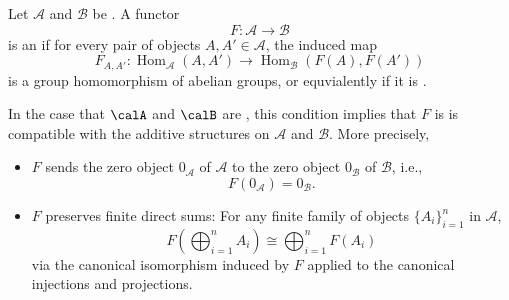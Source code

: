 \begin{definition} \label{definition:additive_functor_between_additive_categories}
    Let $\mathcal{A}$ and $\mathcal{B}$ be . A functor
    $$ F: \mathcal{A} \to \mathcal{B} $$
    is an  if for every pair of objects $A, A' \in \mathcal{A}$, the induced map
    $$ F_{A,A'}: \operatorname{Hom}_{\mathcal{A}}(A, A') \to \operatorname{Hom}_{\mathcal{B}}(F(A), F(A')) $$
    is a group homomorphism of abelian groups, or equvialently if it is .

    In the case that $\calA$ and $\calB$ are , this condition implies that $F$ is is compatible with the additive structures on $\mathcal{A}$ and $\mathcal{B}$. More precisely,
    \begin{itemize}
        \item $F$ sends the zero object $0_{\mathcal{A}}$ of $\mathcal{A}$ to the zero object $0_{\mathcal{B}}$ of $\mathcal{B}$, i.e.,
        $$ F(0_{\mathcal{A}}) = 0_{\mathcal{B}}.  $$
        \item $F$ preserves finite direct sums: For any finite family of objects $\{A_i\}_{i=1}^n$ in $\mathcal{A}$,
        $$ F\left(\bigoplus_{i=1}^n A_i\right) \cong \bigoplus_{i=1}^n F(A_i) $$
        via the canonical isomorphism induced by $F$ applied to the canonical injections and projections.
    \end{itemize}
        
\end{definition}

